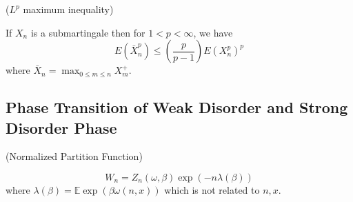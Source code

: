 \begin{theorem}
    ($L^p$ maximum inequality)\par
    If $X_n$ is a submartingale then for $1 < p < \infty$, we have
    \[
    E(\bar{X}_n^p) \leq \left(\dfrac{p}{p-1}\right) E(X_n^p)^p
    \]
    where $\bar{X}_n = \max_{0\leq m\leq n} X_m^+$.
\end{theorem}

\subsection{Phase Transition of Weak Disorder and Strong Disorder Phase}

\begin{definition}
    (Normalized Partition Function)\par
    \[W_n = Z_n(\omega,\beta)\exp{(-n\lambda(\beta))}\]
    where $\lambda(\beta) = \mathbb{E}\exp{\left(\beta \omega(n,x)\right)}$ which is not related to $n,x$.
\end{definition}

